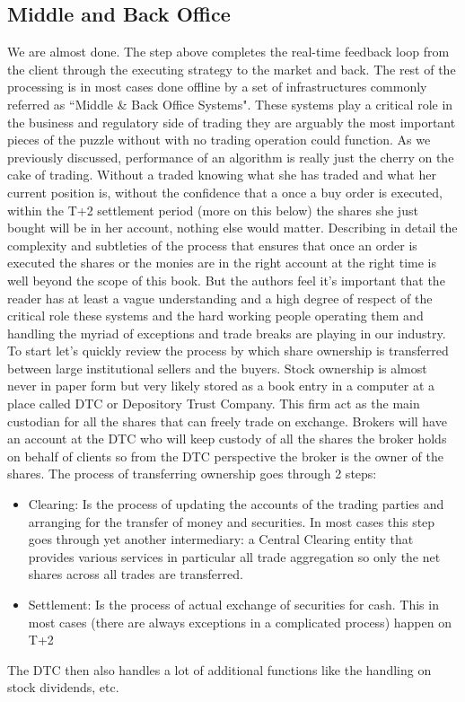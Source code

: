 \subsection{Middle and Back Office}
We are almost done. The step above completes the real-time feedback loop from the client through the executing strategy to the market and back. The rest of the processing is in most cases done offline by a set of infrastructures commonly referred as ``Middle & Back Office Systems". These systems play a critical role in the business and regulatory side of trading they are arguably the most important pieces of the puzzle without with no trading operation could function. As we previously discussed, performance of an algorithm is really just the cherry on the cake of trading. Without a traded knowing what she has traded and what her current position is, without the confidence that a once a buy order is executed, within the T+2 settlement period (more on this below) the shares she just bought will be in her account, nothing else would matter. Describing in detail the complexity and subtleties of the process that ensures that once an order is executed the shares or the monies are in the right account at the right time is well beyond the scope of this book. But the authors feel it's important that the reader has at least a vague understanding and a high degree of respect of the critical role these systems and the hard working people operating them and handling the myriad of exceptions and trade breaks are playing in our industry.\\

To start let's quickly review the process by which share ownership is transferred between large institutional sellers and the buyers. Stock ownership is almost never in paper form but very likely stored as a book entry in a computer at a place called DTC or Depository Trust Company. This firm act as the main custodian for all the shares that can freely trade on exchange. Brokers will have an account at the DTC who will keep custody of all the shares the broker holds on behalf of clients so from the DTC perspective the broker is the owner of the shares. The process of transferring ownership goes through 2 steps:
\begin{itemize}
\item Clearing: Is the process of updating the accounts of the trading parties and arranging for the transfer of money and securities. In most cases this step goes through yet another intermediary: a Central Clearing entity that provides various services in particular all trade aggregation so only the net shares across all trades are  transferred.
\item Settlement: Is the process of actual exchange of securities for cash. This in most cases (there are always exceptions in a complicated process) happen on T+2
\end{itemize}
The DTC then also handles a lot of additional functions like the handling on stock dividends, etc.\\

